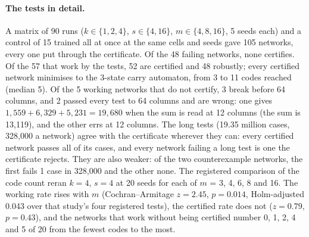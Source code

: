 \documentclass[11pt]{article}
\newcommand{\pn}[2]{#2}
\begin{document}
\paragraph{The tests in detail.} A matrix of \pn{addition.matrix-runs}{90} runs
($k \in \{1, 2, 4\}$, $s \in \{4, 16\}$, $m \in \{4, 8, 16\}$, 5 seeds each) and a control of
\pn{addition.control-runs}{15} trained all at once at the same cells and seeds gave
\pn{addition.networks}{105} networks, every one put through the certificate. Of the
\pn{addition.failing}{48} failing networks, \pn{addition.failing-certified}{none} certifies. Of the
\pn{addition.working}{57} that work by the tests, \pn{addition.certified}{52} are certified and
\pn{addition.robust}{48} robustly; every certified network minimises to the
\pn{addition.minimised}{3}-state carry automaton, from \pn{addition.codes-reached}{3 to 11} codes
reached (median \pn{addition.codes-median}{5}). Of the \pn{addition.working-uncertified}{5} working
networks that do not certify, \pn{addition.break-early}{3} break before 64 columns, and
\pn{addition.wrong-passing}{2} passed every test to 64 columns and are wrong: one gives
$\pn{addition.counterexample}{1{,}559 + 6{,}329 + 5{,}231} = \pn{addition.counterexample-answer}{19{,}680}$
when the sum is read at \pn{addition.counterexample-columns}{12} columns (the sum is
\pn{addition.counterexample-sum}{13{,}119}), and the other errs at
\pn{addition.counterexample-other-columns}{12} columns. The long tests
(\pn{addition.long-cases}{19.35} million cases, \pn{addition.long-each}{328{,}000} a network) agree
with the certificate wherever they can: \pn{addition.long-certified-passing}{every} certified network
passes all of its cases, and \pn{addition.long-failing-rejected}{every} network failing a long test
is one the certificate rejects. They are also weaker: of the two counterexample networks, the first
fails \pn{addition.counterexample-long-wrong}{1} case in 328{,}000 and the other
\pn{addition.counterexample-other-long-wrong}{none}. The registered comparison of the code count
reran $k = 4$, $s = 4$ at \pn{addition.codes-seeds}{20} seeds for each of
$m$ = \pn{addition.codes-m}{3, 4, 6, 8 and 16}. The working rate rises with $m$ (Cochran--Armitage
$z = \pn{addition.codes-working-z}{2.45}$, $p = \pn{addition.codes-working-p}{0.014}$, Holm-adjusted
\pn{addition.codes-working-holm}{0.043} over that study's four registered tests), the certified rate
does not ($z = \pn{addition.codes-certified-z}{0.79}$, $p = \pn{addition.codes-certified-p}{0.43}$),
and the networks that work without being certified number
\pn{addition.codes-uncertified}{0, 1, 2, 4 and 5} of 20 from the fewest codes to the most.
\end{document}

